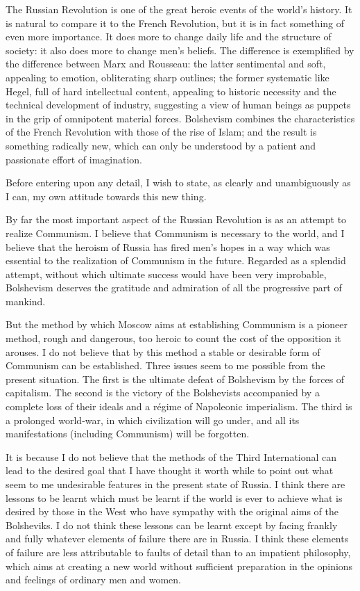 The Russian Revolution is one of the great heroic events of the world's history. It is natural to compare it to the French Revolution, but it is in fact something of even more importance. It does more to change daily life and the structure of society: it also does more to change men's beliefs. The difference is exemplified by the difference between Marx and Rousseau: the latter sentimental and soft, appealing to emotion, obliterating sharp outlines; the former systematic like Hegel, full of hard intellectual content, appealing to historic necessity and the technical development of industry, suggesting a view of human beings as puppets in the grip of omnipotent material forces. Bolshevism combines the characteristics of the French Revolution with those of the rise of Islam; and the result is something radically new, which can only be understood by a patient and passionate effort of imagination.

Before entering upon any detail, I wish to state, as clearly and unambiguously as I can, my own attitude towards this new thing.

By far the most important aspect of the Russian Revolution is as an attempt to realize Communism. I believe that Communism is necessary to the world, and I believe that the heroism of Russia has fired men's hopes in a way which was essential to the realization of Communism in the future. Regarded as a splendid attempt, without which ultimate success would have been very improbable, Bolshevism deserves the gratitude and admiration of all the progressive part of mankind.

But the method by which Moscow aims at establishing Communism is a pioneer method, rough and dangerous, too heroic to count the cost of the opposition it arouses. I do not believe that by this method a stable or desirable form of Communism can be established. Three issues seem to me possible from the present situation. The first is the ultimate defeat of Bolshevism by the forces of capitalism. The second is the victory of the Bolshevists accompanied by a complete loss of their ideals and a régime of Napoleonic imperialism. The third is a prolonged world-war, in which civilization will go under, and all its manifestations (including Communism) will be forgotten.

It is because I do not believe that the methods of the Third International can lead to the desired goal that I have thought it worth while to point out what seem to me undesirable features in the present state of Russia. I think there are lessons to be learnt which must be learnt if the world is ever to achieve what is desired by those in the West who have sympathy with the original aims of the Bolsheviks. I do not think these lessons can be learnt except by facing frankly and fully whatever elements of failure there are in Russia. I think these elements of failure are less attributable to faults of detail than to an impatient philosophy, which aims at creating a new world without sufficient preparation in the opinions and feelings of ordinary men and women.

